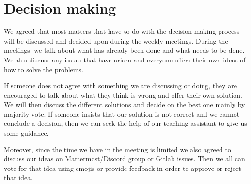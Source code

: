 \section{Decision making}

We agreed that most matters that have to do with the decision making process will be discussed and decided upon during the weekly meetings.
During the meetings, we talk about what has already been done and what needs to be done.
We also discuss any issues that have arisen and everyone offers their own ideas of how to solve the problems.

If someone does not agree with something we are discussing or doing, they are encouraged to talk about what they think is wrong and offer their own solution.
We will then discuss the different solutions and decide on the best one mainly by majority vote.
If someone insists that our solution is not correct and we cannot conclude a decision,
then we can seek the help of our teaching assistant to give us some guidance.

Moreover, since the time we have in the meeting is limited we also agreed to discuss our ideas on Mattermost/Discord group or Gitlab issues.
Then we all can vote for that idea using emojis or provide feedback in order to approve or reject that idea.
